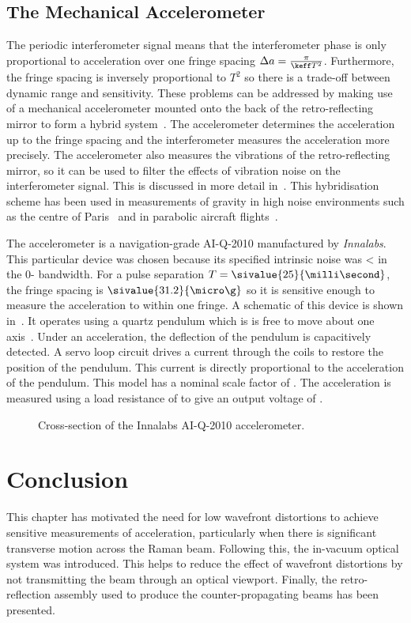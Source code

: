 \subsection{The Mechanical Accelerometer}\label{subsec:raman_mems}
The periodic interferometer signal means that the interferometer phase is only
proportional to acceleration over one fringe spacing \(\Delta a =
\frac{\pi}{\keff T^2}\). Furthermore, the fringe spacing is inversely
proportional to \(T^2\) so there is a trade-off between dynamic range and
sensitivity. These problems can be addressed by making use of a mechanical
accelerometer mounted onto the back of the retro-reflecting mirror to form a
hybrid system~\cite{Lautier2014}. The accelerometer determines the acceleration
up to the fringe spacing  and the interferometer measures the acceleration more
precisely. The accelerometer also measures the vibrations of the
retro-reflecting mirror, so it can be used to filter the effects of vibration
noise on the interferometer signal. This is discussed in more detail
in~. This hybridisation scheme has been
used in measurements of gravity in high noise environments such as the centre of
Paris~\cite{Merlet2009} and in parabolic aircraft
flights~\cite{Geiger2011a,Barrett2016}. \par\noindent The accelerometer is a
navigation-grade AI-Q-2010 manufactured by \textit{Innalabs}. This particular
device was chosen because its specified intrinsic noise was
< in the 0- bandwidth. For a pulse separation \(T
= \sivalue{25}{\milli\second}\), the fringe spacing is
\(\sivalue{31.2}{\micro\g}\) so it is sensitive enough to measure the
acceleration to within one fringe. A schematic of this device is shown
in~. It operates using a quartz pendulum which is is
free to move about one axis~\cite{Foote1992}. Under an acceleration, the
deflection of the pendulum is capacitively detected. A servo loop circuit drives
a current through the coils to restore the position of the pendulum. This
current is directly proportional to the acceleration of the pendulum. This model
has a nominal scale factor of . The
acceleration is measured using a load resistance of  to
give an output voltage of .
\begin{figure}[!htbp] \centering
	\resizebox{0.5\textwidth}{!}{}
	\caption[Innalabs accelerometer cross-section]{Cross-section of the Innalabs
		AI-Q-2010 accelerometer.} \label{fig:innalabs}
\end{figure}

\section{Conclusion}
This chapter has motivated the need for low wavefront distortions to achieve sensitive measurements of acceleration, particularly when there is significant transverse motion across the Raman beam. Following this, the in-vacuum optical system was introduced. This helps to reduce the effect of wavefront distortions by not transmitting the beam through an optical viewport. Finally, the retro-reflection assembly used to produce the counter-propagating beams has been presented.  

